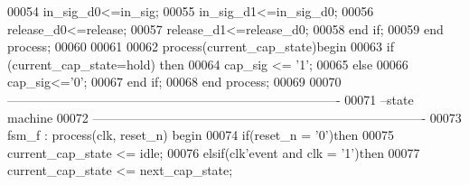 \begin{DoxyCode}
00054          \textcolor{vhdlchar}{in\_sig\_d0}\textcolor{vhdlchar}{<=}\textcolor{vhdlchar}{in\_sig};
00055           \textcolor{vhdlchar}{in\_sig\_d1}\textcolor{vhdlchar}{<=}\textcolor{vhdlchar}{in\_sig\_d0};
00056           \textcolor{vhdlchar}{release\_d0}\textcolor{vhdlchar}{<=}\textcolor{keywordflow}{release};
00057           \textcolor{vhdlchar}{release\_d1}\textcolor{vhdlchar}{<=}\textcolor{vhdlchar}{release\_d0};
00058         \textcolor{keywordflow}{end} \textcolor{keywordflow}{if};
00059     \textcolor{keywordflow}{end} \textcolor{keywordflow}{process};
00060      
00061      
00062     \textcolor{keywordflow}{process}(current\_cap\_state)\textcolor{keywordflow}{begin}
00063     \textcolor{keywordflow}{if} \textcolor{vhdlchar}{(}\textcolor{vhdlchar}{current\_cap\_state}\textcolor{vhdlchar}{=}\textcolor{vhdlchar}{hold}\textcolor{vhdlchar}{)} \textcolor{keywordflow}{then}
00064             \textcolor{vhdlchar}{cap\_sig} \textcolor{vhdlchar}{<=} \textcolor{vhdlchar}{'}\textcolor{vhdllogic}{}\textcolor{vhdllogic}{1}\textcolor{vhdlchar}{'}; 
00065     \textcolor{keywordflow}{else}
00066             \textcolor{vhdlchar}{cap\_sig}\textcolor{vhdlchar}{<=}\textcolor{vhdlchar}{'}\textcolor{vhdllogic}{}\textcolor{vhdllogic}{0}\textcolor{vhdlchar}{'};
00067     \textcolor{keywordflow}{end} \textcolor{keywordflow}{if}; 
00068 \textcolor{keywordflow}{end} \textcolor{keywordflow}{process};
00069      
00070 \textcolor{keyword}{-------------------------------------------------------------------------------}
00071 \textcolor{keyword}{--state machine}
00072 \textcolor{keyword}{-------------------------------------------------------------------------------}
00073 fsm\_f : \textcolor{keywordflow}{process}(clk, reset\_n) \textcolor{keywordflow}{begin}
00074     \textcolor{keywordflow}{if}\textcolor{vhdlchar}{(}\textcolor{vhdlchar}{reset\_n} \textcolor{vhdlchar}{=} \textcolor{vhdlchar}{'}\textcolor{vhdllogic}{}\textcolor{vhdllogic}{0}\textcolor{vhdlchar}{'}\textcolor{vhdlchar}{)}\textcolor{keywordflow}{then}
00075         \textcolor{vhdlchar}{current\_cap\_state} \textcolor{vhdlchar}{<=} \textcolor{vhdlchar}{idle};
00076     \textcolor{keywordflow}{elsif}\textcolor{vhdlchar}{(}\textcolor{vhdlchar}{clk}\textcolor{vhdlchar}{'}\textcolor{vhdlkeyword}{event} \textcolor{keywordflow}{and} \textcolor{vhdlchar}{clk} \textcolor{vhdlchar}{=} \textcolor{vhdlchar}{'}\textcolor{vhdllogic}{}\textcolor{vhdllogic}{1}\textcolor{vhdlchar}{'}\textcolor{vhdlchar}{)}\textcolor{keywordflow}{then} 
00077         \textcolor{vhdlchar}{current\_cap\_state} \textcolor{vhdlchar}{<=} \textcolor{vhdlchar}{next\_cap\_state};

\end{DoxyCode}
